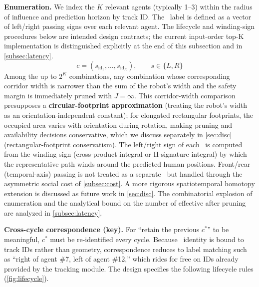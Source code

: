 \textbf{Enumeration.} We index the $K$ relevant agents (typically 1--3) within the radius of influence and prediction horizon by track ID. The \Class\ label is defined as a vector of left/right passing signs over each relevant agent. The lifecycle and winding-sign procedures below are intended design contracts; the current input-order top-K implementation is distinguished explicitly at the end of this subsection and in \cref{subsec:latency}.
\begin{equation}\label{eq:classlabel}
c = (s_{\mathrm{id}_1}, \ldots, s_{\mathrm{id}_K}), \qquad s \in \{L, R\}
\end{equation}
Among the up to $2^K$ combinations, any combination whose corresponding corridor width is narrower than the sum of the robot's width and the safety margin is immediately pruned with $J = \infty$. This corridor-width comparison presupposes a \textbf{circular-footprint approximation} (treating the robot's width as an orientation-independent constant); for elongated rectangular footprints, the occupied area varies with orientation during rotation, making pruning and availability decisions conservative, which we discuss separately in \cref{sec:disc} (rectangular-footprint conservatism). The left/right sign of each \Class\ is computed from the winding sign (cross-product integral or H-signature integral) by which the representative path winds around the predicted human positions. Front/rear (temporal-axis) passing is not treated as a separate \Class\ but handled through the asymmetric social cost of \cref{subsec:cost}. A more rigorous spatiotemporal homotopy extension is discussed as future work in \cref{sec:disc}. The combinatorial explosion of enumeration and the analytical bound on the number of effective  after pruning are analyzed in \cref{subsec:latency}.

\textbf{Cross-cycle correspondence (key).} For ``retain the previous $c^*$'' to be meaningful, $c^*$ must be re-identified every cycle. Because \Class\ identity is bound to track IDs rather than geometry, correspondence reduces to label matching such as ``right of agent \#7, left of agent \#12,'' which rides for free on IDs already provided by the tracking module. The design specifies the following lifecycle rules (\cref{fig:lifecycle}).

